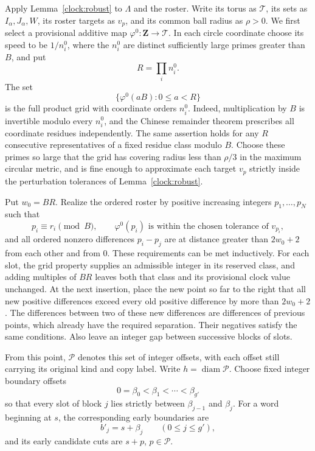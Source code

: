 Apply Lemma~\ref{clock:robust} to $\Lambda$ and the roster.  Write its torus
as $\mathcal T$, its sets as $I_\alpha,J_\alpha,W$, its roster targets as
$v_p$, and its common ball radius as $\rho>0$.  We first select a provisional
additive map $\varphi^0:\mathbf Z\to\mathcal T$.  In each circle coordinate
choose its speed to be $1/n_i^0$, where the $n_i^0$ are distinct sufficiently
large primes greater than $B$, and put
\[
 R=\prod_i n_i^0.
\]
The set
\begin{equation}\label{schedule:provisional-net}
 \{\varphi^0(aB):0\le a<R\}
\end{equation}
is the full product grid with coordinate orders $n_i^0$.  Indeed,
multiplication by $B$ is invertible modulo every $n_i^0$, and the Chinese
remainder theorem prescribes all coordinate residues independently.  The
same assertion holds for any $R$ consecutive representatives of a fixed
residue class modulo $B$.  Choose these primes so large that the grid has
covering radius less than $\rho/3$ in the maximum circular metric, and is
fine enough to approximate each target $v_p$ strictly inside the perturbation
tolerances of Lemma~\ref{clock:robust}.

Put $w_0=BR$.  Realize the ordered roster by positive increasing integers
$p_1,\ldots,p_N$ such that
\begin{equation}\label{schedule:stencil-properties}
 p_i\equiv r_i\pmod B,
 \qquad \varphi^0(p_i)\text{ is within the chosen tolerance of }v_{p_i},
\end{equation}
and all ordered nonzero differences $p_i-p_j$ are at distance greater than
$2w_0+2$ from each other and from $0$.  These requirements can be met
inductively.  For each slot, the grid property supplies an admissible
integer in its reserved class, and adding multiples of $BR$ leaves both
that class and its provisional clock value unchanged.  At the next
insertion, place the new point so far to the right that all new positive
differences exceed every old positive difference by more than $2w_0+2$.
The differences between two of these new differences are differences of
previous points, which already have the required separation.  Their
negatives satisfy the same conditions.  Also leave an integer gap between
successive blocks of slots.

From this point, $\mathcal P$ denotes this set of integer offsets, with each
offset still carrying its original kind and copy label.  Write
$h=\operatorname{diam}\mathcal P$.  Choose fixed integer boundary offsets
\[
 0=\beta_0<\beta_1<\cdots<\beta_{g'}
\]
so that every slot of block $j$ lies strictly between $\beta_{j-1}$ and
$\beta_j$.  For a word beginning at $s$, the corresponding early boundaries
are
\begin{equation}\label{schedule:stencil-boundaries}
 b'_j=s+\beta_j\qquad(0\le j\le g'),
\end{equation}
and its early candidate cuts are $s+p$, $p\in\mathcal P$.

